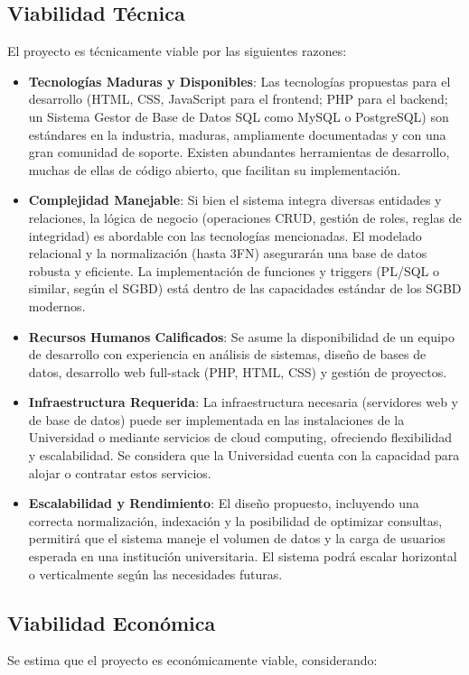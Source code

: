 \subsection{Viabilidad Técnica}
El proyecto es técnicamente viable por las siguientes razones:
\begin{itemize}
    \item \textbf{Tecnologías Maduras y Disponibles}: Las tecnologías propuestas para el desarrollo (HTML, CSS, JavaScript para el frontend; PHP para el backend; un Sistema Gestor de Base de Datos SQL como MySQL o PostgreSQL) son estándares en la industria, maduras, ampliamente documentadas y con una gran comunidad de soporte. Existen abundantes herramientas de desarrollo, muchas de ellas de código abierto, que facilitan su implementación.
\item \textbf{Complejidad Manejable}: Si bien el sistema integra diversas entidades y relaciones, la lógica de negocio (operaciones CRUD, gestión de roles, reglas de integridad) es abordable con las tecnologías mencionadas. El modelado relacional y la normalización (hasta 3FN) asegurarán una base de datos robusta y eficiente. La implementación de funciones y triggers (PL/SQL o similar, según el SGBD) está dentro de las capacidades estándar de los SGBD modernos.
\item \textbf{Recursos Humanos Calificados}: Se asume la disponibilidad de un equipo de desarrollo con experiencia en análisis de sistemas, diseño de bases de datos, desarrollo web full-stack (PHP, HTML, CSS) y gestión de proyectos.
\item \textbf{Infraestructura Requerida}: La infraestructura necesaria (servidores web y de base de datos) puede ser implementada en las instalaciones de la Universidad o mediante servicios de cloud computing, ofreciendo flexibilidad y escalabilidad. Se considera que la Universidad cuenta con la capacidad para alojar o contratar estos servicios.
\item \textbf{Escalabilidad y Rendimiento}: El diseño propuesto, incluyendo una correcta normalización, indexación y la posibilidad de optimizar consultas, permitirá que el sistema maneje el volumen de datos y la carga de usuarios esperada en una institución universitaria. El sistema podrá escalar horizontal o verticalmente según las necesidades futuras.

\end{itemize}
\subsection{Viabilidad Económica}
Se estima que el proyecto es económicamente viable, considerando:

